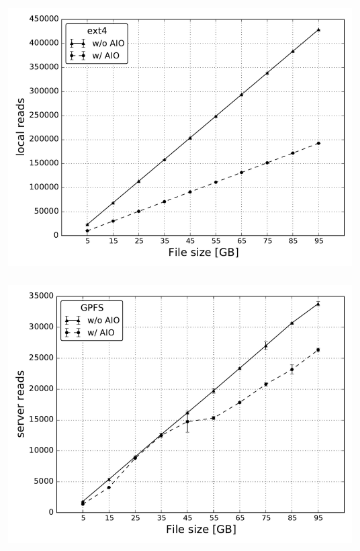 \begin{figure}[!htb]
  \centering
  \begin{subfigure}[t]{0.32\textwidth}
    \centering
    \includegraphics[width=\textwidth]{figures/SC2015/ROOT/separate_plots/test_cluster/ext4/reads}
    \caption{\textit{}}
    \label{figure: ext4_3}
  \end{subfigure}
  \begin{subfigure}[t]{0.32\textwidth}
    \centering
    \includegraphics[width=\textwidth]{figures/SC2015/ROOT/separate_plots/test_cluster/gpfs/server_reads}
    \caption{\textit{}}
    \label{figure: gpfs_3}
  \end{subfigure}
  \begin{subfigure}[t]{0.32\textwidth}

\end{subfigure}
\end{figure}
